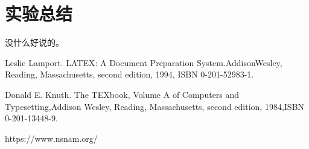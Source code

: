 \documentclass[a4paper,12pt]{report}
\begin{document}
\chapter{实验总结}
\begin{spacing}{1.5}
	没什么好说的。
\end{spacing}


\begin{thebibliography}{99}
\songti {} 	
	Leslie Lamport. LATEX: A Document Preparation System.AddisonWesley, Reading, Massachusetts, second edition, 1994, ISBN 0-201-52983-1.
	
	Donald E. Knuth. The TEXbook, Volume A of Computers and Typesetting,Addison Wesley, Reading, Massachusetts, second edition, 1984,ISBN 0-201-13448-9.

	https://www.nsnam.org/
	
\end{thebibliography}

\end{document}
